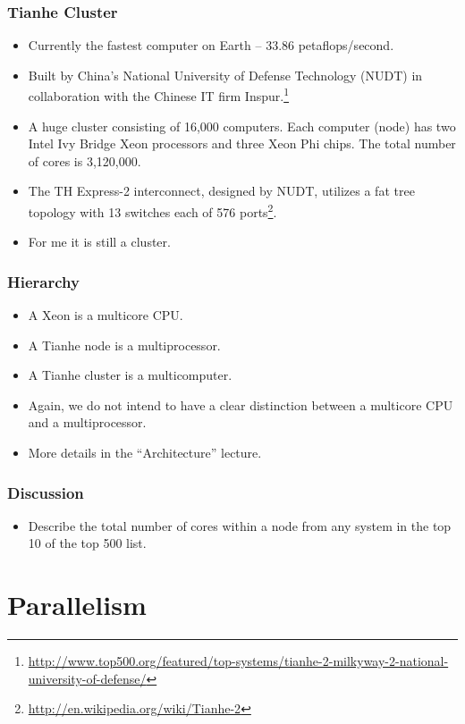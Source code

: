 \documentclass{beamer}
\begin{document}
\begin{CJK}{UTF8}{bsmi}
\begin{frame}
\frametitle{Tianhe Cluster}
\begin{itemize}
\item Currently the fastest computer on Earth -- 33.86
  petaflops/second.
\item Built by China's National University of Defense Technology
  (NUDT) in collaboration with the Chinese IT firm
  Inspur.\footnote{\url{http://www.top500.org/featured/top-systems/tianhe-2-milkyway-2-national-university-of-defense/}}
\item A huge cluster consisting of 16,000 computers.  Each computer
  (node) has two Intel Ivy Bridge Xeon processors and three Xeon Phi
  chips. The total number of cores is 3,120,000.
\item The TH Express-2 interconnect, designed by NUDT, utilizes a fat
  tree topology with 13 switches each of 576 ports\footnote{\url{http://en.wikipedia.org/wiki/Tianhe-2}}.
\item For me it is still a cluster.
\end{itemize}
\end{frame}

\begin{frame}
\frametitle{Hierarchy}
\begin{itemize}
\item A Xeon is a multicore CPU.
\item A Tianhe node is a multiprocessor.
\item A Tianhe cluster is a multicomputer.
\item Again, we do not intend to have a clear distinction between a
  multicore CPU and a multiprocessor.
\item More details in the ``Architecture'' lecture.
\end{itemize}
\end{frame}

\begin{frame}
\frametitle{Discussion} 
\begin{itemize}
\item Describe the total number of cores within a node from any
  system in the top 10 of the top 500 list.
\end{itemize}
\end{frame}


\section{Parallelism}


\end{CJK}
\end{document}
